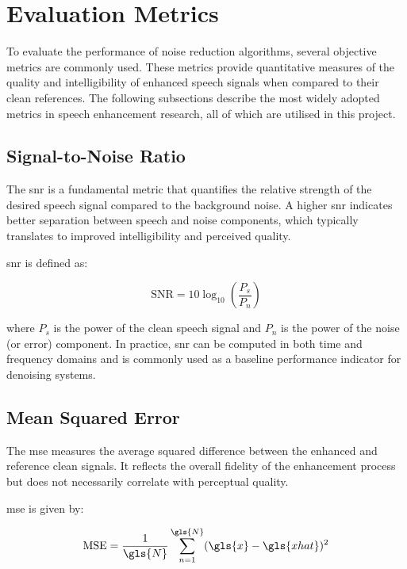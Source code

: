 \section{Evaluation Metrics}
\label{sec:evaluation_metrics}

To evaluate the performance of noise reduction algorithms, several objective metrics are commonly used. These metrics provide quantitative measures of the quality and intelligibility of enhanced speech signals when compared to their clean references. The following subsections describe the most widely adopted metrics in speech enhancement research, all of which are utilised in this project.

\subsection{Signal-to-Noise Ratio}
\label{subsec:snr}

The \gls{snr} is a fundamental metric that quantifies the relative strength of the desired speech signal compared to the background noise. A higher \gls{snr} indicates better separation between speech and noise components, which typically translates to improved intelligibility and perceived quality.

\gls{snr} is defined as:

\begin{equation}
    \text{SNR} = 10 \log_{10} \left( \frac{P_s}{P_n} \right)
\end{equation}

where \( P_s \) is the power of the clean speech signal and \( P_n \) is the power of the noise (or error) component. In practice, \gls{snr} can be computed in both time and frequency domains and is commonly used as a baseline performance indicator for denoising systems.

\subsection{Mean Squared Error}
\label{subsec:mse}

The \gls{mse} measures the average squared difference between the enhanced and reference clean signals. It reflects the overall fidelity of the enhancement process but does not necessarily correlate with perceptual quality.

\gls{mse} is given by:

\begin{equation}
    \text{MSE} = \frac{1}{\gls{N}} \sum_{n=1}^{\gls{N}} (\gls{x} - \gls{xhat})^2
\end{equation}

